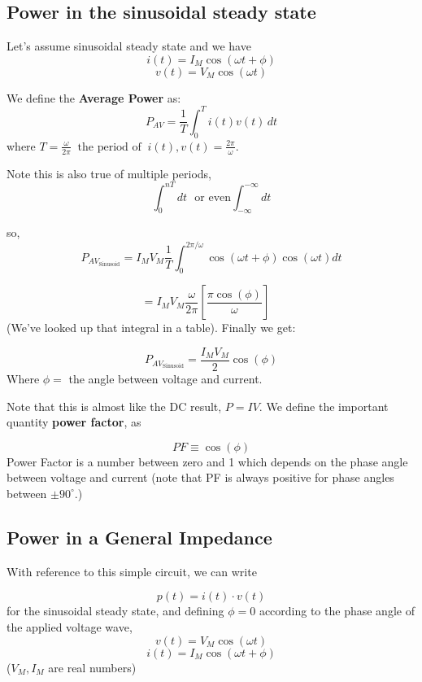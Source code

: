 \subsection{Power in the sinusoidal steady state}
Let's assume sinusoidal steady state and we have
\[
i(t) = I_M \cos(\omega t + \phi)
\]
\[
v(t) = V_M \cos(\omega t)
\]

\noindent We define the {\bf Average Power} as:
\[
P_{AV} = \frac{1}{T} \int_0^T i(t) v(t) \, dt
\]
where $T = \frac {\omega}  {2\pi}\;\; \text{the~period~of}  \;\; i(t), v(t) = \frac{2\pi}{\omega}$.


\noindent Note this is  also true of multiple periods,
\[
\int_0^{nT} dt \text{~~or~even} \int_{-\infty}^{-\infty}dt
\]



\noindent so,
\[
P_{AV_{\text{Sinusoid}}} = I_MV_M\frac{1}{T} \int_0^{2\pi/\omega}  \cos(\omega t + \phi) \cos(\omega t) dt
\]

\[
= I_M V_M \frac{\omega}{2\pi} \left[ \frac{\pi \cos(\phi)}{\omega} \right] \quad
\]
(We've looked up that integral in a table).   Finally we get:

\[
P_{AV_{\text{Sinusoid}}} = \frac{I_M V_M}{2} \cos(\phi)
\]
Where $ \phi = $ the angle between voltage and current.

Note that this is almost like the DC result, $P=IV$.   We
define the important quantity {\bf power factor}, as

\[
PF \equiv \cos(\phi)
\]
Power Factor is
a number between zero and 1 which depends on the phase angle between
voltage and current (note that PF is always positive for phase
angles between $\pm 90^\circ$.)


\subsection{Power in a General Impedance}

With reference to this simple circuit, we can write
%

\[
p(t) = i(t) \cdot v(t)
\]
for the sinusoidal steady state, and defining $\phi=0$ according
to the phase angle of the applied voltage wave,
\[
v(t) = V_M\cos(\omega t)
\]
\[
i(t) = I_M\cos(\omega t + \phi)
\]
($V_M, I_M$ are real numbers)

